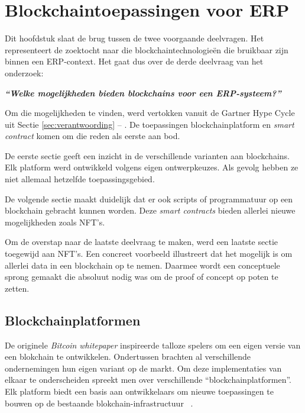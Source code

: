 \chapter{Blockchaintoepassingen voor ERP}
\label{ch:blockchaintoepassingen-voor-erp}

Dit hoofdstuk slaat de brug tussen de twee voorgaande deelvragen. Het representeert de zoektocht naar die blockchaintechnologieën die bruikbaar zijn binnen een ERP-context. Het gaat dus over de derde deelvraag van het onderzoek:

\begin{center}
	\textit{\textbf{``Welke mogelijkheden bieden blockchains voor een ERP-systeem?''}}
\end{center}

Om die mogelijkheden te vinden, werd vertokken vanuit de Gartner Hype Cycle uit Sectie \ref{sec:verantwoording} -- . De toepassingen blockchainplatform en \textit{smart contract} komen om die reden als eerste aan bod.

De eerste sectie geeft een inzicht in de verschillende varianten aan blockchains. Elk platform werd ontwikkeld volgens eigen ontwerpkeuzes. Als gevolg hebben ze niet allemaal hetzelfde toepassingsgebied.

De volgende sectie maakt duidelijk dat er ook scripts of programmatuur op een blockchain gebracht kunnen worden. Deze \textit{smart contracts} bieden allerlei nieuwe mogelijkheden zoals NFT's. 

Om de overstap naar de laatste deelvraag te maken, werd een laatste sectie toegewijd aan NFT's. Een concreet voorbeeld illustreert dat het mogelijk is om allerlei data in een blockchain op te nemen. Daarmee wordt een conceptuele sprong gemaakt die absoluut nodig was om de proof of concept op poten te zetten.

\section{Blockchainplatformen}
\label{sec:blockchainplatformen}

De originele \textit{Bitcoin} \textit{whitepaper} inspireerde talloze spelers om een eigen versie van een blokchain te ontwikkelen. Ondertussen brachten al verschillende ondernemingen hun eigen variant op de markt. Om deze implementaties van elkaar te onderscheiden spreekt men over verschillende ``blockchainplatformen''. Elk platform biedt een basis aan ontwikkelaars om nieuwe toepassingen te bouwen op de bestaande blokchain-infrastructuur
~\autocite{Saraf2018}.

